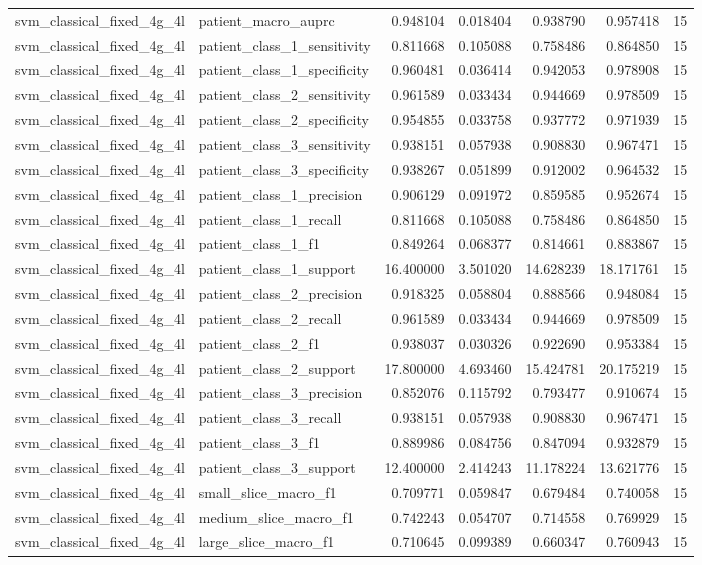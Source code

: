 \begin{tabular}{llrrrrr}
svm_classical_fixed_4g_4l & patient_macro_auprc & 0.948104 & 0.018404 & 0.938790 & 0.957418 & 15 \\
svm_classical_fixed_4g_4l & patient_class_1_sensitivity & 0.811668 & 0.105088 & 0.758486 & 0.864850 & 15 \\
svm_classical_fixed_4g_4l & patient_class_1_specificity & 0.960481 & 0.036414 & 0.942053 & 0.978908 & 15 \\
svm_classical_fixed_4g_4l & patient_class_2_sensitivity & 0.961589 & 0.033434 & 0.944669 & 0.978509 & 15 \\
svm_classical_fixed_4g_4l & patient_class_2_specificity & 0.954855 & 0.033758 & 0.937772 & 0.971939 & 15 \\
svm_classical_fixed_4g_4l & patient_class_3_sensitivity & 0.938151 & 0.057938 & 0.908830 & 0.967471 & 15 \\
svm_classical_fixed_4g_4l & patient_class_3_specificity & 0.938267 & 0.051899 & 0.912002 & 0.964532 & 15 \\
svm_classical_fixed_4g_4l & patient_class_1_precision & 0.906129 & 0.091972 & 0.859585 & 0.952674 & 15 \\
svm_classical_fixed_4g_4l & patient_class_1_recall & 0.811668 & 0.105088 & 0.758486 & 0.864850 & 15 \\
svm_classical_fixed_4g_4l & patient_class_1_f1 & 0.849264 & 0.068377 & 0.814661 & 0.883867 & 15 \\
svm_classical_fixed_4g_4l & patient_class_1_support & 16.400000 & 3.501020 & 14.628239 & 18.171761 & 15 \\
svm_classical_fixed_4g_4l & patient_class_2_precision & 0.918325 & 0.058804 & 0.888566 & 0.948084 & 15 \\
svm_classical_fixed_4g_4l & patient_class_2_recall & 0.961589 & 0.033434 & 0.944669 & 0.978509 & 15 \\
svm_classical_fixed_4g_4l & patient_class_2_f1 & 0.938037 & 0.030326 & 0.922690 & 0.953384 & 15 \\
svm_classical_fixed_4g_4l & patient_class_2_support & 17.800000 & 4.693460 & 15.424781 & 20.175219 & 15 \\
svm_classical_fixed_4g_4l & patient_class_3_precision & 0.852076 & 0.115792 & 0.793477 & 0.910674 & 15 \\
svm_classical_fixed_4g_4l & patient_class_3_recall & 0.938151 & 0.057938 & 0.908830 & 0.967471 & 15 \\
svm_classical_fixed_4g_4l & patient_class_3_f1 & 0.889986 & 0.084756 & 0.847094 & 0.932879 & 15 \\
svm_classical_fixed_4g_4l & patient_class_3_support & 12.400000 & 2.414243 & 11.178224 & 13.621776 & 15 \\
svm_classical_fixed_4g_4l & small_slice_macro_f1 & 0.709771 & 0.059847 & 0.679484 & 0.740058 & 15 \\
svm_classical_fixed_4g_4l & medium_slice_macro_f1 & 0.742243 & 0.054707 & 0.714558 & 0.769929 & 15 \\
svm_classical_fixed_4g_4l & large_slice_macro_f1 & 0.710645 & 0.099389 & 0.660347 & 0.760943 & 15 \\
\bottomrule
\end{tabular}
